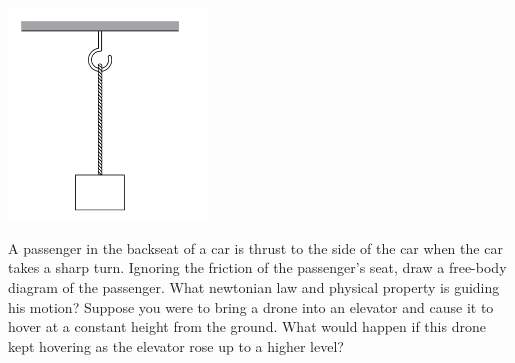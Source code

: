 \documentclass{exam}
\begin{document}
\begin{questions}
        \begin{center}\includegraphics[width=200px]{../assets/hook.png}\end{center}
        \question A passenger in the backseat of a car is thrust to the side of the car when the car takes a sharp turn. Ignoring the friction of the passenger's seat, draw a free-body diagram of the passenger. What newtonian law and physical property is guiding his motion?
        \vspace*{0.5in}
        \question Suppose you were to bring a drone into an elevator and cause it to hover at a constant height from the ground. What would happen if this drone kept hovering as the elevator rose up to a higher level?
    \end{questions}
\end{document}
